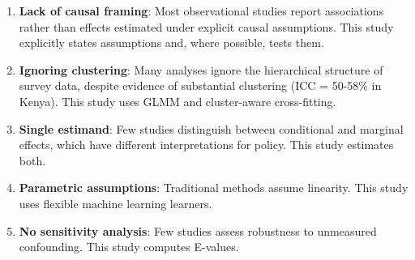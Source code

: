 \begin{enumerate}
	\item \textbf{Lack of causal framing}: Most observational studies report associations rather than effects estimated under explicit causal assumptions. This study explicitly states assumptions and, where possible, tests them.
	
	\item \textbf{Ignoring clustering}: Many analyses ignore the hierarchical structure of survey data, despite evidence of substantial clustering (ICC = 50-58\% in Kenya). This study uses GLMM and cluster-aware cross-fitting.
	
	\item \textbf{Single estimand}: Few studies distinguish between conditional and marginal effects, which have different interpretations for policy. This study estimates both.
	
	\item \textbf{Parametric assumptions}: Traditional methods assume linearity. This study uses flexible machine learning learners.
	
	\item \textbf{No sensitivity analysis}: Few studies assess robustness to unmeasured confounding. This study computes E-values.
\end{enumerate}
